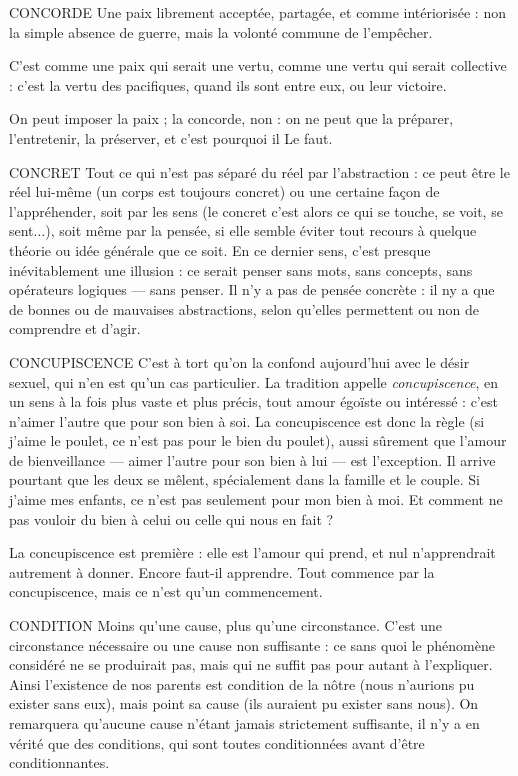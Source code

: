 CONCORDE Une paix librement acceptée, partagée, et comme intériorisée :
non la simple absence de guerre, mais la volonté commune de l'empêcher.

C’est comme une paix qui serait une vertu, comme une vertu qui serait
collective : c’est la vertu des pacifiques, quand ils sont entre eux, ou leur victoire.

On peut imposer la paix ; la concorde, non : on ne peut que la préparer,
l’entretenir, la préserver, et c’est pourquoi il Le faut.

CONCRET Tout ce qui n’est pas séparé du réel par l’abstraction : ce peut
être le réel lui-même (un corps est toujours concret) ou une
certaine façon de l’appréhender, soit par les sens (le concret c’est alors ce qui se
touche, se voit, se sent...), soit même par la pensée, si elle semble éviter tout
recours à quelque théorie ou idée générale que ce soit. En ce dernier sens, c’est
presque inévitablement une illusion : ce serait penser sans mots, sans concepts,
sans opérateurs logiques — sans penser. Il n’y a pas de pensée concrète : il ny a
que de bonnes ou de mauvaises abstractions, selon qu’elles permettent ou non
de comprendre et d’agir.

CONCUPISCENCE C’est à tort qu’on la confond aujourd’hui avec le
désir sexuel, qui n’en est qu’un cas particulier. La tradition
appelle {\it concupiscence}, en un sens à la fois plus vaste et plus précis, tout
amour égoïste ou intéressé : c’est n’aimer l’autre que pour son bien à soi. La
concupiscence est donc la règle (si j'aime le poulet, ce n’est pas pour le bien du
poulet), aussi sûrement que l’amour de bienveillance — aimer l’autre pour son
bien à lui — est l’exception. Il arrive pourtant que les deux se mêlent, spécialement
dans la famille et le couple. Si j’aime mes enfants, ce n’est pas seulement
pour mon bien à moi. Et comment ne pas vouloir du bien à celui ou celle qui
nous en fait ?

La concupiscence est première : elle est l’amour qui prend, et nul n’apprendrait
autrement à donner. Encore faut-il apprendre. Tout commence par la
concupiscence, mais ce n’est qu'un commencement.

CONDITION Moins qu’une cause, plus qu’une circonstance. C’est une
circonstance nécessaire ou une cause non suffisante : ce sans
quoi le phénomène considéré ne se produirait pas, mais qui ne suffit pas pour
autant à l'expliquer. Ainsi l’existence de nos parents est condition de la nôtre
(nous n’aurions pu exister sans eux), mais point sa cause (ils auraient pu exister
sans nous). On remarquera qu'aucune cause n'étant jamais strictement suffisante,
il n’y a en vérité que des conditions, qui sont toutes conditionnées avant
d’être conditionnantes.

